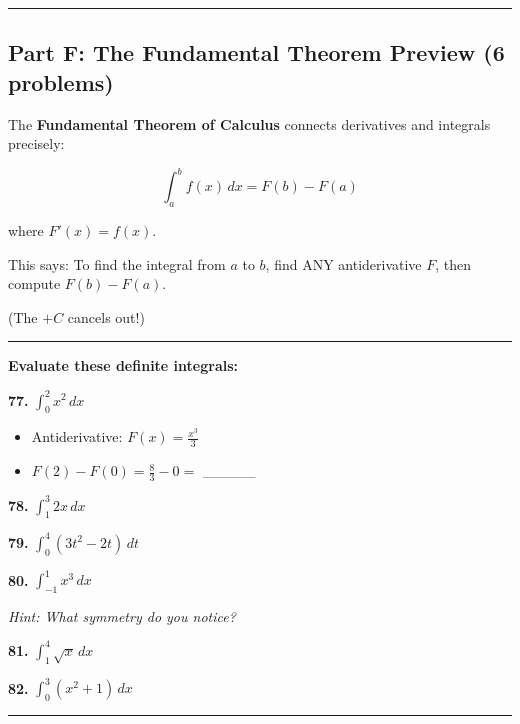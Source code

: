 \documentclass[
  11pt,
]{article}
\providecommand{\tightlist}{%
  \setlength{\itemsep}{0pt}\setlength{\parskip}{0pt}}
\begin{document}
\begin{center}\rule{0.5\linewidth}{0.5pt}\end{center}

\hypertarget{part-f-the-fundamental-theorem-preview-6-problems}{%
\subsection{Part F: The Fundamental Theorem Preview (6
problems)}\label{part-f-the-fundamental-theorem-preview-6-problems}}

The \textbf{Fundamental Theorem of Calculus} connects derivatives and
integrals precisely:

\[\int_a^b f(x) \, dx = F(b) - F(a)\]

where \(F'(x) = f(x)\).

This says: To find the integral from \(a\) to \(b\), find ANY
antiderivative \(F\), then compute \(F(b) - F(a)\).

(The \(+C\) cancels out!)

\begin{center}\rule{0.5\linewidth}{0.5pt}\end{center}

\textbf{Evaluate these definite integrals:}

\textbf{77.} \(\int_0^2 x^2 \, dx\)

\begin{itemize}
\tightlist
\item
  Antiderivative: \(F(x) = \frac{x^3}{3}\)
\item
  \(F(2) - F(0) = \frac{8}{3} - 0 ={}\) \_\_\_\_\_
\end{itemize}

\textbf{78.} \(\int_1^3 2x \, dx\)

\textbf{79.} \(\int_0^4 (3t^2 - 2t) \, dt\)

\textbf{80.} \(\int_{-1}^{1} x^3 \, dx\)

\emph{Hint: What symmetry do you notice?}

\textbf{81.} \(\int_1^4 \sqrt{x} \, dx\)

\textbf{82.} \(\int_0^3 (x^2 + 1) \, dx\)

\begin{center}\rule{0.5\linewidth}{0.5pt}\end{center}
\end{document}
